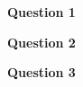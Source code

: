\documentclass[12pt]{article}
\begin{document}


{\bf \Large Question 1}



{\bf \Large Question 2}



{\bf \Large Question 3}


\end{document}
